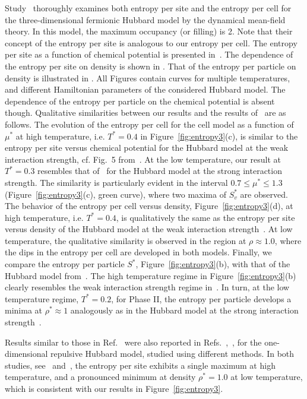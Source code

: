 \documentclass[entropy,article,submit,pdftex,moreauthors]{Definitions/mdpi}
\begin{document}
Study~\citep{dLBKGS11} thoroughly examines both entropy per site and the entropy per cell for the three-dimensional fermionic Hubbard model by the dynamical mean-field theory. In this model, the maximum occupancy (or filling) is 2. Note that their concept of the entropy per site is analogous to our entropy per cell.
The entropy per site as a function of chemical potential is presented in~\citep[Figs.~5 and~6]{dLBKGS11}. The dependence of the entropy per site on density is shown in \citep[Fig.~7]{dLBKGS11}.
That of the entropy per particle on density is illustrated in \citep[Fig.~8]{dLBKGS11}. All Figures contain curves for multiple temperatures, and different Hamiltonian parameters of the considered Hubbard model.
The dependence of the entropy per particle on the chemical potential is absent though. Qualitative similarities between our results and the results of~\citep{dLBKGS11} are as follows. The evolution of the entropy per cell for the cell model as a function of $\mu^*$ at high temperature, i.e. $T^*=0.4$ in Figure~\ref{fig:entropy3}(c), is similar to the entropy per site versus chemical potential for the Hubbard model at the weak interaction strength, cf. Fig.~5 from~\citep{dLBKGS11}. At the low temperature, our result at $T^*=0.3$ resembles that of~\citep[Fig.~6]{dLBKGS11} for the Hubbard model at the strong interaction strength. The similarity is particularly evident in the interval $0.7 \leq \mu^* \leq 1.3$ (Figure~\ref{fig:entropy3}(c), green curve), where two maxima of $S^*_v$ are observed. The behavior of the entropy per cell versus density, Figure~\ref{fig:entropy3}(d), at high temperature, i.e. $T^*=0.4$, is qualitatively the same as the entropy per site versus density of the Hubbard model at the weak interaction strength~\citep[Fig.~7]{dLBKGS11}. At low temperature, the qualitative similarity is observed in the region at $\rho \approx 1.0$, where the dips in the entropy per cell are developed in both models. Finally, we compare the entropy per particle $S^*$, Figure~\ref{fig:entropy3}(b), with that of the Hubbard model from~\citep[Fig.~7]{dLBKGS11}. The high temperature regime in Figure~\ref{fig:entropy3}(b) clearly resembles the weak interaction strength regime in~\citep[Fig.~7]{dLBKGS11}. In turn, at the low temperature regime, $T^*=0.2$, for Phase II, the entropy per particle develops a minima at $\rho^* \approx 1$ analogously as in the Hubbard model at the strong interaction strength~\citep[Fig.~7]{dLBKGS11}.

Results similar to those in Ref.~\citep{dLBKGS11} were also reported in Refs.~\citep{Campo15},~\citep{PKF20}, for the one-dimensional repulsive Hubbard model, studied using different methods. In both studies, see~\citep[Fig.~4]{Campo15} and~\citep[Fig.21a]{PKF20}, the entropy per site exhibits a single maximum at high temperature, and a pronounced minimum at density $\rho^*=1.0$ at low temperature, which is consistent with our results in Figure~\ref{fig:entropy3}. 
\end{document}
